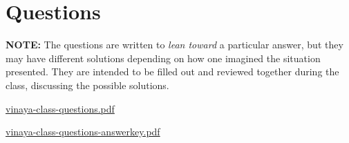 \chapter{Questions}

\textbf{NOTE:} The questions are written to \emph{lean toward} a
particular answer, but they may have different solutions depending on
how one imagined the situation presented. They are intended to be filled
out and reviewed together during the class, discussing the possible
solutions.

\href{./includes/docs/vinaya-class-questions.pdf}{vinaya-class-questions.pdf}

\href{./includes/docs/vinaya-class-questions-answerkey.pdf}{vinaya-class-questions-answerkey.pdf}

